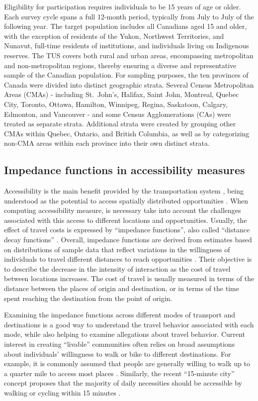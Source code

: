 \documentclass[preprint, 3p,
authoryear]{elsarticle} %
\begin{document}
Eligibility for participation requires individuals to be 15 years of age
or older. Each survey cycle spans a full 12-month period, typically from
July to July of the following year. The target population includes all
Canadians aged 15 and older, with the exception of residents of the
Yukon, Northwest Territories, and Nunavut, full-time residents of
institutions, and individuals living on Indigenous reserves. The TUS
covers both rural and urban areas, encompassing metropolitan and
non-metropolitan regions, thereby ensuring a diverse and representative
sample of the Canadian population. For sampling purposes, the ten
provinces of Canada were divided into distinct geographic strata.
Several Census Metropolitan Areas (CMAs) - including St.~John's,
Halifax, Saint John, Montreal, Quebec City, Toronto, Ottawa, Hamilton,
Winnipeg, Regina, Saskatoon, Calgary, Edmonton, and Vancouver - and some
Census Agglomerations (CAs) were treated as separate strata. Additional
strata were created by grouping other CMAs within Quebec, Ontario, and
British Columbia, as well as by categorizing non-CMA areas within each
province into their own distinct strata.

\subsection{Impedance functions in accessibility
measures}\label{impedance-functions-in-accessibility-measures}

Accessibility is the main benefit provided by the transportation system
\citep{pereira2017}, being understood as the potential to access
spatially distributed opportunities \citep{hansen1959, paez2012}. When
computing accessibility measure, is necessary take into account the
challenges associated with this access to different locations and
opportunities. Usually, the effect of travel costs is expressed by
``impedance functions'', also called ``distance decay functions''
\citep{soukhov2024}. Overall, impedance functions are derived from
estimates based on distributions of sample data that reflect variations
in the willingness of individuals to travel different distances to reach
opportunities \citep{li2020approach}. Their objective is to describe the
decrease in the intensity of interaction as the cost of travel between
locations increases. The cost of travel is usually measured in terms of
the distance between the places of origin and destination, or in terms
of the time spent reaching the destination from the point of origin.

Examining the impedance functions across different modes of transport
and destinations is a good way to understand the travel behavior
associated with each mode, while also helping to examine allegations
about travel behavior. Current interest in creating ``livable''
communities often relies on broad assumptions about individuals'
willingness to walk or bike to different destinations. For example, it
is commonly assumed that people are generally willing to walk up to a
quarter mile to access most places \citep{untermann1984, larsen2010}.
Similarly, the recent ``15-minute city'' concept proposes that the
majority of daily necessities should be accessible by walking or cycling
within 15 minutes \citep{moreno2021}.
\end{document}
